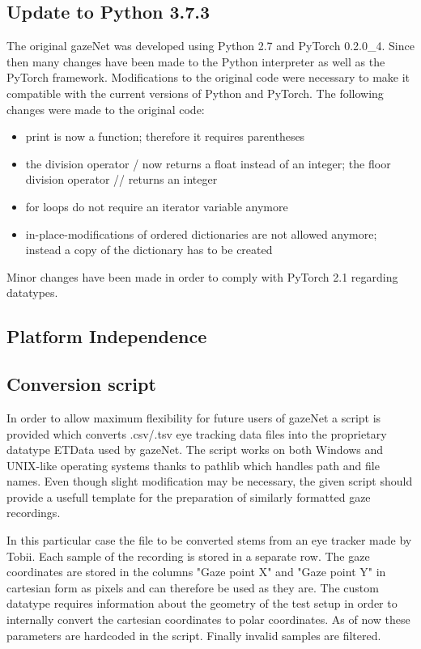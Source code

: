 \documentclass[conference]{IEEEtran}
\begin{document}
\subsection{Update to Python 3.7.3}
The original gazeNet was developed using Python 2.7 and PyTorch 0.2.0\_4. Since then many changes have been made to the Python interpreter as well as the PyTorch framework. Modifications to the original code were necessary to make it compatible with the current versions of Python and PyTorch. The following changes were made to the original code:
\begin{itemize}
    \item print is now a function; therefore it requires parentheses
    \item the division operator / now returns a float instead of an integer; the floor division operator // returns an integer
    \item for loops do not require an iterator variable anymore
    \item in-place-modifications of ordered dictionaries are not allowed anymore; instead a copy of the dictionary has to be created
\end{itemize}
Minor changes have been made in order to comply with PyTorch 2.1 regarding datatypes.

\subsection{Platform Independence}

\subsection{Conversion script}
In order to allow maximum flexibility for future users of gazeNet a script is provided which converts .csv/.tsv eye tracking data files into the proprietary datatype ETData used by gazeNet. The script works on both Windows and UNIX-like operating systems thanks to pathlib which handles path and file names. Even though slight modification may be necessary, the given script should provide a usefull template for the preparation of similarly formatted gaze recordings.

In this particular case the file to be converted stems from an eye tracker made by Tobii. Each sample of the recording is stored in a separate row. The gaze coordinates are stored in the columns "Gaze point X" and "Gaze point Y" in cartesian form as pixels and can therefore be used as they are. The custom datatype requires information about the geometry of the test setup in order to internally convert the cartesian coordinates to polar coordinates. As of now these parameters are hardcoded in the script. Finally invalid samples are filtered.
\end{document}
